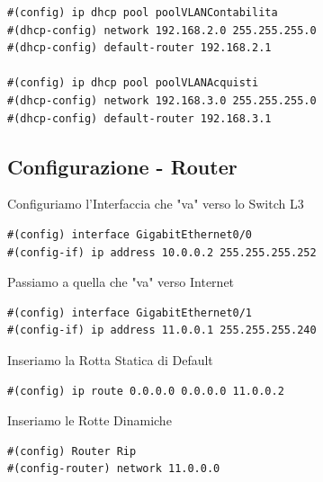 \documentclass[12pt]{article}
\begin{document}
\begin{center}
\begin{tcolorbox}[title=Multilayer Switch, colframe=gray!50!gray, colback=white!50!white]
\begin{lstlisting}
#(config) ip dhcp pool poolVLANContabilita
#(dhcp-config) network 192.168.2.0 255.255.255.0
#(dhcp-config) default-router 192.168.2.1

#(config) ip dhcp pool poolVLANAcquisti
#(dhcp-config) network 192.168.3.0 255.255.255.0
#(dhcp-config) default-router 192.168.3.1
                \end{lstlisting} 
            \end{tcolorbox}
        \end{center}

    \newpage
    \subsection{Configurazione - Router}
    \begin{center}
        Configuriamo l'Interfaccia che "va" verso lo Switch L3
        \begin{tcolorbox}[title=Router, colframe=gray!50!gray, colback=white!50!white]
            \begin{lstlisting}
#(config) interface GigabitEthernet0/0
#(config-if) ip address 10.0.0.2 255.255.255.252
            \end{lstlisting}
        \end{tcolorbox} 
        Passiamo a quella che "va" verso Internet
        \begin{tcolorbox}[title=Router, colframe=gray!50!gray, colback=white!50!white]
            \begin{lstlisting}
#(config) interface GigabitEthernet0/1
#(config-if) ip address 11.0.0.1 255.255.255.240
\end{lstlisting}
        \end{tcolorbox}
        Inseriamo la Rotta Statica di Default
            \begin{tcolorbox}[title=Multilayer Switch, colframe=gray!50!gray, colback=white!50!white]
                \begin{lstlisting}
#(config) ip route 0.0.0.0 0.0.0.0 11.0.0.2
                \end{lstlisting} 
            \end{tcolorbox}
            Inseriamo le Rotte Dinamiche 
            \begin{tcolorbox}[title=Router, colframe=gray!50!gray, colback=white!50!white]
                \begin{lstlisting}
#(config) Router Rip
#(config-router) network 11.0.0.0
                \end{lstlisting}    
            \end{tcolorbox}
    \end{center}
\end{document}
